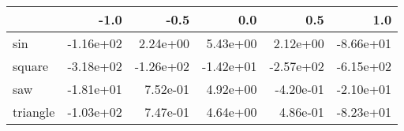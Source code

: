 \begin{tabular}{lrrrrr}
\toprule
{} &      -1.0 &      -0.5 &       0.0 &       0.5 &       1.0 \\
\midrule
sin      & -1.16e+02 &  2.24e+00 &  5.43e+00 &  2.12e+00 & -8.66e+01 \\
square   & -3.18e+02 & -1.26e+02 & -1.42e+01 & -2.57e+02 & -6.15e+02 \\
saw      & -1.81e+01 &  7.52e-01 &  4.92e+00 & -4.20e-01 & -2.10e+01 \\
triangle & -1.03e+02 &  7.47e-01 &  4.64e+00 &  4.86e-01 & -8.23e+01 \\
\bottomrule
\end{tabular}
